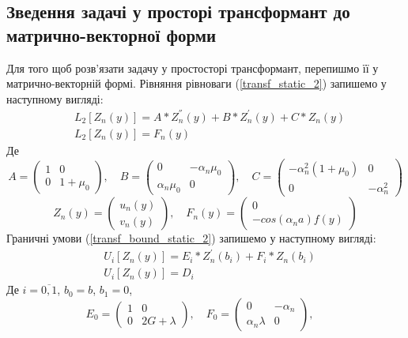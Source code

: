 \subsection{Зведення задачі у просторі трансформант до матрично-векторної форми}
Для того щоб розв'язати задачу у простосторі трансформант, перепишмо її у матрично-векторній формі.
Рівняння рівноваги (\ref{transf_static_2}) запишемо у наступному вигляді:
\begin{align}\label{transf_mat_static_2}
    &L_2\left[ Z_n(y) \right] = A * Z_n^{''}(y) + B * Z_n^{'}(y) + C * Z_n(y) \nonumber \\
    &L_2\left[ Z_n(y) \right] = F_n(y)
\end{align}
Де
\begin{equation*}
    A = \begin{pmatrix}
        1 & 0 \\
        0 & 1 + \mu_0
    \end{pmatrix}, \quad
    B = \begin{pmatrix}
        0 & -\alpha_n \mu_0 \\
        \alpha_n \mu_0 & 0
    \end{pmatrix}, \quad
    C = \begin{pmatrix}
        -\alpha_n^2(1 + \mu_0) & 0 \\
        0 & -\alpha_n^2
    \end{pmatrix}
\end{equation*}
\begin{equation*}
    Z_n(y) = \begin{pmatrix}
        u_n(y) \\
        v_n(y)
    \end{pmatrix}, \quad 
    F_n(y) = \begin{pmatrix}
        0 \\
        - cos(\alpha_n a) f(y)
    \end{pmatrix}
\end{equation*}
Граничні умови (\ref{transf_bound_static_2}) запишемо у наступному вигляді:
\begin{align}\label{transf_bound_mat_static_2}
    &U_i\left[ Z_n(y) \right] = E_i * Z_n^{'}(b_i) + F_i * Z_n(b_i) \nonumber \\
    & U_i\left[ Z_n(y) \right] = D_i
\end{align}
Де $i = \overline{0, 1}$, $b_0 = b$, $b_1 = 0$,
\begin{equation*}
    E_0 = \begin{pmatrix}
        1 & 0 \\
        0 & 2G + \lambda
    \end{pmatrix}, \quad
    F_0 = \begin{pmatrix}
        0 & -\alpha_n \\
        \alpha_n \lambda & 0
    \end{pmatrix}, \quad
\end{equation*}
